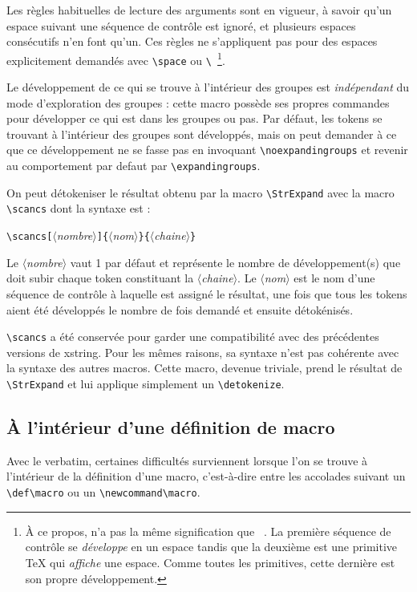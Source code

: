 \documentclass[a4paper,10pt,french]{article}
\newcommand\argu[1]{$\langle$\textit{#1}$\rangle$}
\newcommand\ARGU[1]{\texttt{\color{black}\{}\argu{#1}\texttt{\color{black}\}}}
\newcommand\arguC[1]{\texttt{\color{black}[}\argu{#1}\texttt{\color{black}]}}
\newcommand\Xstring{\textsf{xstring}\xspace}
\newcommand\verbinline{\lstinline[basicstyle=\normalsize\ttfamily]}
\begin{document}
Les règles habituelles de lecture des arguments sont en vigueur, à savoir qu'un espace suivant une séquence de contrôle est ignoré, et plusieurs espaces consécutifs n'en font qu'un. Ces règles ne s'appliquent pas pour des espaces explicitement demandés avec \verb-\space- ou \verb*-\ -\footnote{À ce propos, \texttt{\string\space} n'a pas la même signification que \texttt{\string\ }. La première séquence de contrôle se \emph{développe} en un espace tandis que la deuxième est une primitive \TeX{} qui \emph{affiche} une espace. Comme toutes les primitives, cette dernière est son propre développement.}.\smallskip

Le développement de ce qui se trouve à l'intérieur des groupes est \emph{indépendant} du mode d'exploration des groupes : cette macro possède ses propres commandes pour développer ce qui est dans les groupes ou pas. Par défaut, les tokens se trouvant à l'intérieur des groupes sont développés, mais on peut demander à ce que ce développement ne se fasse pas en invoquant \verbinline-\noexpandingroups- et revenir au comportement par defaut par \verbinline-\expandingroups-.\bigskip

On peut détokeniser le résultat obtenu par la macro \verbinline-\StrExpand- avec la macro \verbinline-\scancs- dont la syntaxe est :\par\nobreak\medskip
\verbinline|\scancs|\arguC{nombre}\ARGU{nom}\ARGU{chaine}\par\nobreak\smallskip
Le \argu{nombre} vaut 1 par défaut et représente le nombre de développement(s) que doit subir chaque token constituant la \argu{chaine}. Le \argu{nom} est le nom d'une séquence de contrôle à laquelle est assigné le résultat, une fois que tous les tokens aient été développés le nombre de fois demandé et ensuite détokénisés.\smallskip

\verbinline-\scancs-  a été conservée pour garder une compatibilité avec des précédentes versions de \Xstring. Pour les mêmes raisons, sa syntaxe n'est pas cohérente avec la syntaxe des autres macros. Cette macro, devenue triviale, prend le résultat de \verbinline|\StrExpand| et lui applique simplement un \verbinline|\detokenize|.

\subsection{À l'intérieur d'une définition de macro}
Avec le verbatim, certaines difficultés surviennent lorsque l'on se trouve à l'intérieur de la définition d'une macro, c'est-à-dire entre les accolades suivant un \verb|\def\macro| ou un \verb|\newcommand\macro|.\medskip
\end{document}
